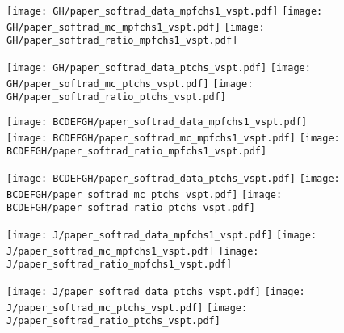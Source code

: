 \documentclass[landscape,10pt]{beamer} %
\begin{document}
\newpage

\begin{figure}[p]
\centering
  \texttt{[image: GH/paper\_softrad\_data\_mpfchs1\_vspt.pdf]}
  \texttt{[image: GH/paper\_softrad\_mc\_mpfchs1\_vspt.pdf]}
  \texttt{[image: GH/paper\_softrad\_ratio\_mpfchs1\_vspt.pdf]}
\end{figure}

\begin{figure}[p]
\centering
  \texttt{[image: GH/paper\_softrad\_data\_ptchs\_vspt.pdf]}
  \texttt{[image: GH/paper\_softrad\_mc\_ptchs\_vspt.pdf]}
  \texttt{[image: GH/paper\_softrad\_ratio\_ptchs\_vspt.pdf]}
\end{figure}

\newpage

\begin{figure}[p]
\centering
  \texttt{[image: BCDEFGH/paper\_softrad\_data\_mpfchs1\_vspt.pdf]}
  \texttt{[image: BCDEFGH/paper\_softrad\_mc\_mpfchs1\_vspt.pdf]}
  \texttt{[image: BCDEFGH/paper\_softrad\_ratio\_mpfchs1\_vspt.pdf]}
\end{figure}

\begin{figure}[p]
\centering
  \texttt{[image: BCDEFGH/paper\_softrad\_data\_ptchs\_vspt.pdf]}
  \texttt{[image: BCDEFGH/paper\_softrad\_mc\_ptchs\_vspt.pdf]}
  \texttt{[image: BCDEFGH/paper\_softrad\_ratio\_ptchs\_vspt.pdf]}
\end{figure}

\newpage

\begin{figure}[p]
\centering
  \texttt{[image: J/paper\_softrad\_data\_mpfchs1\_vspt.pdf]}
  \texttt{[image: J/paper\_softrad\_mc\_mpfchs1\_vspt.pdf]}
  \texttt{[image: J/paper\_softrad\_ratio\_mpfchs1\_vspt.pdf]}
\end{figure}

\begin{figure}[p]
\centering
  \texttt{[image: J/paper\_softrad\_data\_ptchs\_vspt.pdf]}
  \texttt{[image: J/paper\_softrad\_mc\_ptchs\_vspt.pdf]}
  \texttt{[image: J/paper\_softrad\_ratio\_ptchs\_vspt.pdf]}
\end{figure}

\newpage
\end{document}
